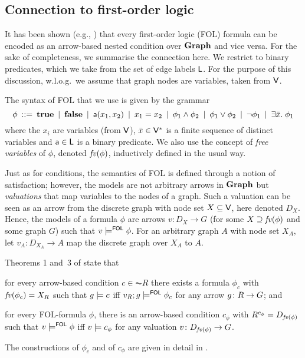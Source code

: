 \subsection{Connection to first-order logic}

It has been shown (e.g., \cite{Rensink-FOL,Habel-FOL}) that every first-order logic (FOL) formula can be encoded as an arrow-based nested condition over $\mathbf{Graph}$ and vice versa. For the sake of completeness, we summarise the connection here. We restrict to binary predicates, which we take from the set of edge labels $\mathsf{L}$. For the purpose of this discussion, w.l.o.g.\ we assume that graph nodes are variables, taken from $\mathsf{V}$.

The syntax of FOL that we use is given by the grammar
%
\[ \phi \:::=\: \textbf{true}
        \:\mid\: \textbf{false}
		\:\mid\: \mathsf{a}(x_1,x_2)
        \:\mid\: x_1=x_2
		\:\mid\: \phi_1\wedge \phi_2
		\:\mid\: \phi_1\vee \phi_2
		\:\mid\: \neg\phi_1
		\:\mid\: \exists \bar x.\; \phi_1 
		\]
where the $x_i$ are variables (from $\mathsf{V}$), $\bar x\in \mathsf{V}^*$ is a finite sequence of distinct variables and $\mathsf{a} \in \mathsf{L}$ is a binary predicate. We also use the concept of \emph{free variables} of $\phi$, denoted $\mathit{fv}(\phi)$, inductively defined in the usual way.

Just as for conditions, the semantics of FOL is defined through a notion of satisfaction; however, the models are not arbitrary arrows in $\mathbf{Graph}$ but \emph{valuations} that map variables to the nodes of a graph. Such a valuation can be seen as an arrow from the discrete graph with node set $X\subseteq \mathsf{V}$, here denoted $D_X$. Hence, the models of a formula $\phi$ are arrows $v:D_X\to G$ (for some $X\supseteq \mathit{fv}(\phi)$ and some graph $G$) such that $v\models^{\mathsf{FOL}} \phi$. For an arbitrary graph $A$ with node set $X_A$, let $v_A:D_{X_A}\to A$ map the discrete graph over $X_A$ to $A$.

Theorems 1 and~3 of \cite{Rensink-FOL} state that
\begin{enumerate*}[label=\emph{(\roman*)}]
\item for every arrow-based condition $c\in \AC R$ there exists a formula $\phi_c$ with $\mathit{fv}(\phi_c)=X_R$ such that $g\models c$ iff $v_R;g\models^{\mathsf{FOL}} \phi_c$ for any arrow $g\colon R\rightarrow G$; and

\item for every FOL-formula $\phi$, there is an arrow-based condition $c_\phi$ with $R^{c_\phi}=D_{\mathit{fv}(\phi)}$ such that $v\models^{\mathsf{FOL}} \phi$ iff $v\models c_\phi$ for any valuation $v\colon D_{\mathit{fv}(\phi)}\rightarrow G$.
\end{enumerate*}
The constructions of $\phi_c$ and of $c_\phi$ are given in detail in \cite{Rensink-FOL}.

